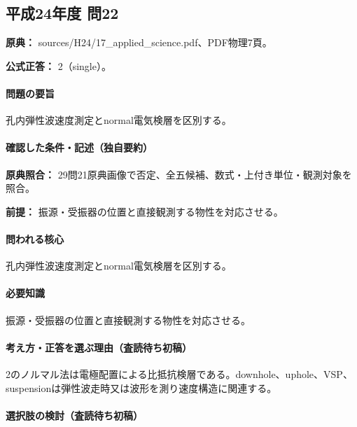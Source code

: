 \subsection{平成24年度 問22}
\label{q:h24-reg-applied-22}

\noindent\textbf{原典：} sources/H24/17\_applied\_science.pdf、PDF物理7頁。

\textbf{公式正答：} 2（single）。

\paragraph{問題の要旨} 孔内弾性波速度測定とnormal電気検層を区別する。

\paragraph{確認した条件・記述（独自要約）}\mbox{}\par

\noindent\textbf{原典照合：} 29問21原典画像で否定、全五候補、数式・上付き単位・観測対象を照合。\par

\noindent\textbf{前提：} 振源・受振器の位置と直接観測する物性を対応させる。\par

\paragraph{問われる核心} 孔内弾性波速度測定とnormal電気検層を区別する。

\paragraph{必要知識} 振源・受振器の位置と直接観測する物性を対応させる。

\paragraph{考え方・正答を選ぶ理由（査読待ち初稿）} 2のノルマル法は電極配置による比抵抗検層である。downhole、uphole、VSP、suspensionは弾性波走時又は波形を測り速度構造に関連する。

\paragraph{選択肢の検討（査読待ち初稿）}\mbox{}\par


